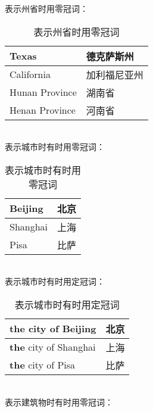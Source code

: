 \documentclass[UTF8]{ctexart}
\begin{document}
    表示州省时用零冠词：
    \begin{table}[h!]
        \begin{center}
            \ttfamily
            \begin{tabular}{p{180pt}|p{100pt}}
                \hline
                Texas&德克萨斯州\\ \hline
                California&加利福尼亚州\\ \hline
                Hunan Province&湖南省\\ \hline
                Henan Province&河南省\\ \hline
            \end{tabular}
            \rmfamily
            \caption{表示州省时用零冠词}
        \end{center}
    \end{table}\\
    表示城市时有时用零冠词：
    \begin{table}[h!]
        \begin{center}
            \ttfamily
            \begin{tabular}{p{180pt}|p{100pt}}
                \hline
                Beijing&北京\\ \hline
                Shanghai&上海\\ \hline
                Pisa&比萨\\ \hline
            \end{tabular}
            \rmfamily
            \caption{表示城市时有时用零冠词}
        \end{center}
    \end{table}\\
    表示城市时有时用定冠词：
    \begin{table}[h!]
        \begin{center}
            \ttfamily
            \begin{tabular}{p{180pt}|p{100pt}}
                \hline
                \textbf{the} city of Beijing&北京\\ \hline
                \textbf{the} city of Shanghai&上海\\ \hline
                \textbf{the} city of Pisa&比萨\\ \hline
            \end{tabular}
            \rmfamily
            \caption{表示城市时有时用定冠词}
        \end{center}
    \end{table}\\
    表示建筑物时有时用零冠词：
\end{document}
